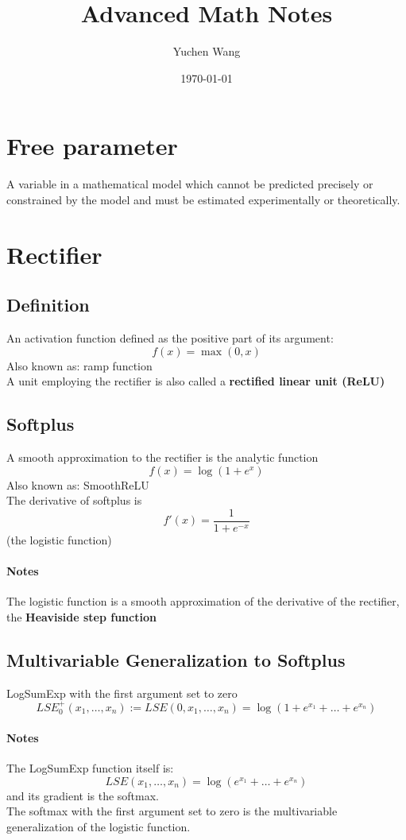 \documentclass[11pt]{article}
\title{Advanced Math Notes}
\author{Yuchen Wang}
\date{\today}
\newcommand{\tb}[1]{\textbf{#1}}
\begin{document}
	\maketitle
	\tableofcontents
	\newpage
	\section{Free parameter}
	A variable in a mathematical model which cannot be predicted precisely or constrained by the model and must be estimated experimentally or theoretically.
	\section{Rectifier}
	\subsection{Definition}
	An activation function defined as the positive part of its argument:
	$$f(x) = \max(0,x)$$
	Also known as: ramp function \\
	A unit employing the rectifier is also called a \tb{rectified linear unit (ReLU)}
	\subsection{Softplus}
	A smooth approximation to the rectifier is the analytic function $$f(x) = \log(1+e^x)$$
	Also known as: SmoothReLU\\
	The derivative of softplus is $$f'(x) = \frac{1}{1+e^{-x}}$$(the logistic function)
	\paragraph{Notes}
	The logistic function is a smooth approximation of the derivative of the rectifier, the \tb{Heaviside step function}
	\subsection{Multivariable Generalization to Softplus}
	LogSumExp with the first argument set to zero
	$$LSE_0^+(x_1,\hdots,x_n) := LSE(0,x_1,\hdots,x_n) = \log(1+e^{x_1} + \hdots + e^{x_n})$$
	\paragraph{Notes}
	The LogSumExp function itself is:
	$$LSE(x_1,\hdots,x_n) = \log(e^{x_1} + \hdots + e^{x_n})$$
	and its gradient is the softmax.\\
	The softmax with the first argument set to zero is the multivariable generalization of the logistic function.
\end{document}
